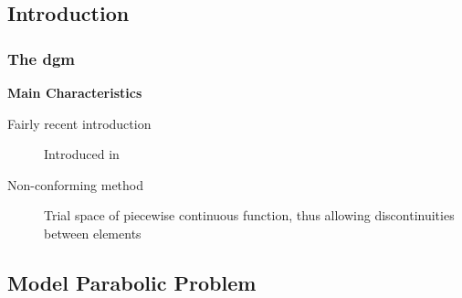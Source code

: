 \subsection{Introduction}

\begin{frame}
    \frametitle{The \acrfull{dgm}}

    \vspace*{\fill}
    \begin{center}
        {\color{\accentcolor} \Large \textbf{Main Characteristics}}
    \end{center}

    \vspace*{0.125cm}

    \begin{center}
        \begin{minipage}{0.75\textwidth}
            \begin{description}
                \item[Fairly recent introduction] Introduced in 
                \item[Non-conforming method] Trial space of piecewise continuous function, thus allowing discontinuities between elements
            \end{description}
        \end{minipage}
    \end{center}

    \vspace*{\fill}
    
\end{frame}

\subsection{Model Parabolic Problem}

